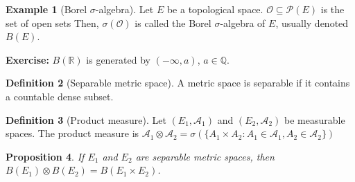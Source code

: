 \documentclass{article}
\theoremstyle{definition}
\newtheorem{defn}{Definition}[section]
\newtheorem{example}[defn]{Example}
\theoremstyle{remark}
\theoremstyle{plain}
\newtheorem{prop}[defn]{Proposition}
\newcommand{\QQ}{\mathbb{Q}}
\newcommand{\RR}{\mathbb{R}}
\begin{document}
\begin{example}[Borel $\sigma$-algebra]
Let $E$ be a topological space. $\mathcal{O}\subseteq\mathcal{P}(E)$ is the set of open sets Then, $\sigma(\mathcal{O})$ is called the Borel $\sigma$-algebra of $E$, usually denoted $B(E)$.
\end{example}
\textbf{Exercise:} $B(\RR)$ is generated by $(-\infty,a)$, $a\in\QQ$.
\begin{defn}[Separable metric space]
    A metric space is separable if it contains a countable dense subset.
\end{defn}
\begin{defn}[Product measure]
    Let $(E_1,\mathcal{A}_1)$ and $(E_2,\mathcal{A}_2)$ be measurable spaces. The product measure is $\mathcal{A}_1\otimes\mathcal{A}_2=\sigma(\{A_1\times A_2:A_1\in\mathcal{A}_1, A_2\in\mathcal{A}_2\})$
\end{defn}
\begin{prop}
    If $E_1$ and $E_2$ are separable metric spaces, then $B(E_1)\otimes B(E_2)=B(E_1\times E_2)$.
\end{prop}
\end{document}
